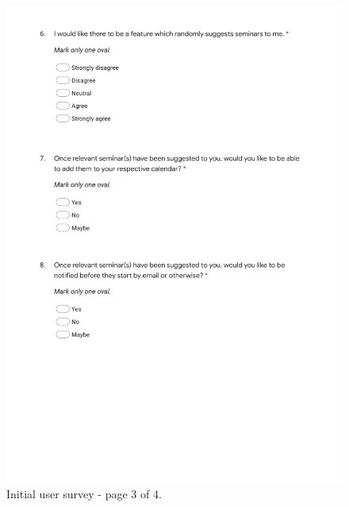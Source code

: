 \documentclass{l4proj}
\begin{document}
\begin{appendices}
\begin{figure}[htb]
    \centering
    \includegraphics[width=\linewidth]{images/initial_user_survey_3.pdf}    
    \caption{Initial user survey - page 3 of 4.}
    \label{fig:initial_user_survey_3} 
\end{figure}


\end{appendices}
\end{document}
